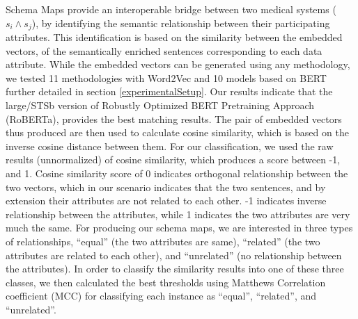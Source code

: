 \documentclass{ieeeaccess}
\begin{document}
Schema Maps provide an interoperable bridge between two medical systems ($s_i \wedge s_j$), by identifying the semantic relationship between their participating attributes. This identification is based on the similarity between the embedded vectors, of the semantically enriched sentences corresponding to each data attribute. While the embedded vectors can be generated using any methodology, we tested 11 methodologies with Word2Vec and 10 models based on BERT further detailed in section \ref{experimentalSetup}. Our results indicate that the large/STSb version of Robustly Optimized BERT Pretraining Approach (RoBERTa)\cite{reimers-2019-sentence-bert}, provides the best matching results. The pair of embedded vectors thus produced are then used to calculate cosine similarity, which is based on the inverse cosine distance between them. For our classification, we used the raw results (unnormalized) of cosine similarity, which produces a score between -1, and 1. Cosine similarity score of 0 indicates orthogonal relationship between the two vectors, which in our scenario indicates that the two sentences, and by extension their attributes are not related to each other. -1 indicates inverse relationship between the attributes, while 1 indicates the two attributes are very much the same.
For producing our schema maps, we are interested in three types of relationships, ``equal'' (the two attributes are same), ``related'' (the two attributes are related to each other), and ``unrelated'' (no relationship between the attributes). In order to classify the similarity results into one of these three classes, we then calculated the best thresholds using Matthews Correlation coefficient (MCC) \cite{chicco2020advantages} for classifying each instance as ``equal'', ``related'', and ``unrelated''. 
\end{document}
